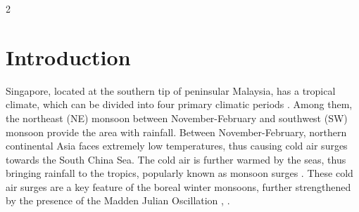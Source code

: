 \documentclass[12pt]{article}
\begin{document}
\begin{multicols}{2}
    \section*{Introduction}
    \begin{paragraph}
        \noindent Singapore, located at the southern tip of peninsular Malaysia, has a tropical climate, which can be divided into 
        four primary climatic periods \cite{NEA_2024}. Among them, the northeast (NE) monsoon between November-February and southwest (SW) monsoon
        provide the area with rainfall. Between November-February, northern continental Asia faces extremely low temperatures, thus causing 
        cold air surges towards the South China Sea. The cold air is further warmed by the seas, thus bringing rainfall to the tropics, popularly known as 
        monsoon surges \cite{NEA_2024}. These cold air surges are a key feature of the boreal winter monsoons, further strengthened by the presence of the Madden Julian Oscillation \cite{Chang2005_EquatorialDisturbances}, \cite{Lim2017_MonsoonRainfall}.
        

\end{paragraph}
\end{multicols}
\end{document}
